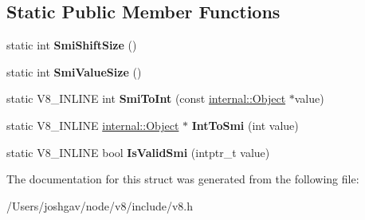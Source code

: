 \subsection*{Static Public Member Functions}
\begin{DoxyCompactItemize}
\item 
static int {\bfseries Smi\+Shift\+Size} ()\hypertarget{structv8_1_1internal_1_1_smi_tagging_3_014_01_4_a6b4e44bb5de76851c70fb604e1a7a019}{}\label{structv8_1_1internal_1_1_smi_tagging_3_014_01_4_a6b4e44bb5de76851c70fb604e1a7a019}

\item 
static int {\bfseries Smi\+Value\+Size} ()\hypertarget{structv8_1_1internal_1_1_smi_tagging_3_014_01_4_a07e9a8ef19de5cb4bba23cd9756d7b3e}{}\label{structv8_1_1internal_1_1_smi_tagging_3_014_01_4_a07e9a8ef19de5cb4bba23cd9756d7b3e}

\item 
static V8\+\_\+\+I\+N\+L\+I\+NE int {\bfseries Smi\+To\+Int} (const \hyperlink{classv8_1_1internal_1_1_object}{internal\+::\+Object} $\ast$value)\hypertarget{structv8_1_1internal_1_1_smi_tagging_3_014_01_4_a62bf3521541e99483c8d0743685dc375}{}\label{structv8_1_1internal_1_1_smi_tagging_3_014_01_4_a62bf3521541e99483c8d0743685dc375}

\item 
static V8\+\_\+\+I\+N\+L\+I\+NE \hyperlink{classv8_1_1internal_1_1_object}{internal\+::\+Object} $\ast$ {\bfseries Int\+To\+Smi} (int value)\hypertarget{structv8_1_1internal_1_1_smi_tagging_3_014_01_4_abbc2788d901a590f3b9276e7e0d4059b}{}\label{structv8_1_1internal_1_1_smi_tagging_3_014_01_4_abbc2788d901a590f3b9276e7e0d4059b}

\item 
static V8\+\_\+\+I\+N\+L\+I\+NE bool {\bfseries Is\+Valid\+Smi} (intptr\+\_\+t value)\hypertarget{structv8_1_1internal_1_1_smi_tagging_3_014_01_4_a7ca3b3a7b14e2fbea5decac3675ac619}{}\label{structv8_1_1internal_1_1_smi_tagging_3_014_01_4_a7ca3b3a7b14e2fbea5decac3675ac619}

\end{DoxyCompactItemize}


The documentation for this struct was generated from the following file\+:\begin{DoxyCompactItemize}
\item 
/\+Users/joshgav/node/v8/include/v8.\+h\end{DoxyCompactItemize}
